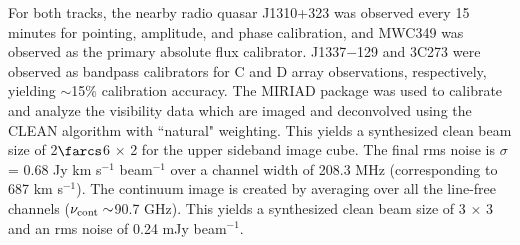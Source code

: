 \documentclass[]{emulateapj}
\begin{document}
For both tracks, the nearby radio quasar J1310+323 was observed every 15 minutes for
pointing, amplitude, and phase calibration, and MWC349 was observed as the primary
absolute flux calibrator. J1337$-$129 and 3C273 were observed as bandpass calibrators for C and D array observations, respectively, yielding $\sim
$15\% calibration accuracy.
The MIRIAD package was used to calibrate and analyze the visibility data which are imaged and deconvolved using
the CLEAN algorithm with ``natural" weighting. This yields a synthesized clean beam size of 2$\farcs$6 $\times$ 2 for the upper sideband image cube. The final rms noise is $\sigma$ = 0.68 Jy km s$^{-1}$ beam$^{-1}$ over a channel width of 208.3 MHz (corresponding to 687 km s$^{-1}$). %
The continuum image is created by
averaging over all the line-free channels ($\nu_{\rm cont}\sim$90.7 GHz). This yields a synthesized clean beam size of 3 $\times$ 3 and an rms noise of 0.24 mJy beam$^{-1}$.
%
%
%
%
%
\end{document}
